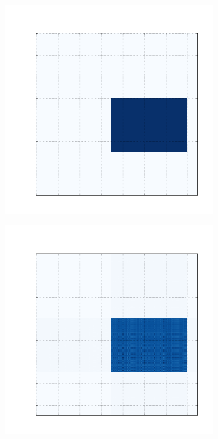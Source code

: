 \documentclass[10pt]{beamer}
\begin{document}
\begin{frame}
\begin{figure}[H]
\begin{subfigure}[b]{0.13\textwidth}
      \end{subfigure}
      \begin{subfigure}[b]{0.13\textwidth}
          \includegraphics[width=\textwidth]{img/a-reconstruction-fnmtf.png}
      \end{subfigure}
      \begin{subfigure}[b]{0.13\textwidth}
          \includegraphics[width=\textwidth]{img/a-reconstruction-ovnmtf.png}

\end{subfigure}
\end{figure}
\end{frame}
\end{document}
